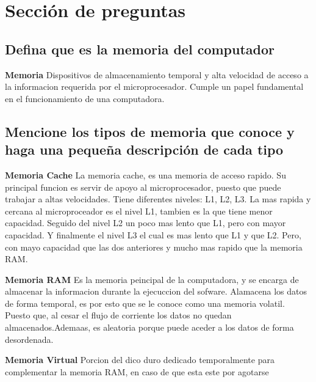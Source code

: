 \documentclass{article}
\begin{document}
\section{Sección de preguntas}\label{contenido}

\subsection{Defina que es la memoria del computador}


\begin{tcolorbox}[colupper=red!75!black]
	\textbf{Memoria}
	\tcblower
	Dispositivos de almacenamiento temporal y alta velocidad de acceso a la informacion requerida por el microprocesador. Cumple un papel fundamental en el funcionamiento de una computadora.
\end{tcolorbox}

\subsection{Mencione los tipos de memoria que conoce y haga una pequeña descripción de cada tipo}

\begin{tcolorbox}[colupper=red!75!black]
	\textbf{Memoria Cache}
	\tcblower
	La memoria cache, es una memoria de acceso rapido. Su principal funcion es servir de apoyo al microprocesador, puesto que puede trabajar a altas velocidades. Tiene diferentes niveles: L1, L2, L3. La mas rapida y cercana al microproceador es el nivel L1, tambien es la que tiene menor capacidad. Seguido del nivel L2 un poco mas lento que L1, pero con mayor capacidad. Y finalmente el nivel L3 el cual es mas lento que L1 y que L2. Pero, con mayo capacidad que las dos anteriores y mucho mas rapido que la memoria RAM.
\end{tcolorbox}

\begin{tcolorbox}[colupper=red!75!black]
	\textbf{Memoria RAM}
	\tcblower
	Es la memoria peincipal de la computadora, y se encarga de almacenar la informacion durante la ejecuccion del sofware. Alamacena los datos de forma temporal, es por esto que se le conoce como una memoria volatil. Puesto que, al cesar el flujo de corriente los datos no quedan almacenados.Ademaas, es aleatoria porque puede aceder a los datos de forma desordenada.
\end{tcolorbox}

\begin{tcolorbox}[colupper=red!75!black]
	\textbf{Memoria Virtual}
	\tcblower
	Porcion del dico duro dedicado temporalmente para complementar la memoria RAM, en caso de que esta este por agotarse
\end{tcolorbox}
\end{document}
